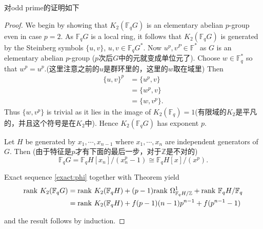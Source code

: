 对odd prime的证明如下
\begin{proof}
	We begin by showing that  $K_2(\mathbb{F}_qG)$  is an elementary abelian $p$-group even in
case $p=2$. As {\color{green} $\mathbb{F}_q G$ is a local ring}, it follows that  $K_2(\mathbb{F}_qG)$  is
generated by the Steinberg symbols $\{u, v\}$, $u, v \in \mathbb{F}_q G^*$. Now $u^p, v^P \in \mathbb{F}^*$ as $G$
is an elementary abelian $p$-group ($p$次后$G$中的元就变成单位元了). Choose $w\in \mathbb{F}_q^*$ so that  $w^p= u^p$.(这里注意之前的$u$是群环里的，这里的$w$取在域里)  Then
\begin{align*}
\{u, v\}^p &= \{u^p, v\}\\
&= \{w^p, v\}\\
&= \{w, v^p\}.
\end{align*}
Thus $\{w, v^p\}$ is trivial as it lies in the image of $K_2(\mathbb{F}_q)= 1$(有限域的$K_2$是平凡的，并且这个符号是在$K_2$中). Hence  $K_2(\mathbb{F}_qG)$  has exponent $p$.

Let $H$ be generated by $x_1 ,\cdots, x_{n-1}$ where $x_1 ,\cdots, x_n$ are independent generators of $G$. Then (由于特征是$p$才有下面的最后一步，对于$\mathbb{Z}$是不对的)
\[\mathbb{F}_q G = \mathbb{F}_qH [x_n] /(x_n^p-  1) \cong \mathbb{F}_q H[x]/(x^p).\]

Exact sequence \ref{exact:phi} together with Theorem yield
\begin{align*}
\mathrm{rank\ } K_2 (\mathbb{F}_q G) & = \mathrm{rank\ }  K_2(\mathbb{F}_q H) + (p-  1) \mathrm{rank\ } \Omega^1_{\mathbb{F}_q H/\mathbb{Z}}+  \mathrm{rank\ } \mathbb{F}_qH/\mathbb{F}_q \\
& = \mathrm{rank\ } K_2(\mathbb{F}_q H)+f(p-1)(n-1)p^{n-1}  +f(p^{n- 1}- 1)
\end{align*}

and the result follows by induction.


\end{proof}
